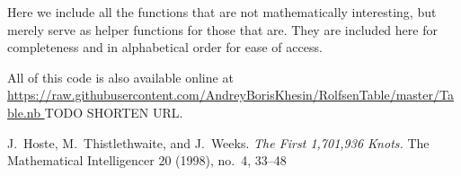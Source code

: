 \begin{paper}

Here we include all the functions that are not mathematically interesting, but
merely serve as helper functions for those that are.
They are included here for completeness and in alphabetical order for ease of
access.

All of this code is also available online at \url{
https://raw.githubusercontent.com/AndreyBorisKhesin/RolfsenTable/master/Table.nb
} TODO SHORTEN URL.















\begin{thebibliography}{}
J.~Hoste, M.~Thistlethwaite, and J.~Weeks.
\textit{The First 1,701,936 Knots.}
The Mathematical Intelligencer 20 (1998), no.~4, 33--48
\end{thebibliography}


\end{paper}

